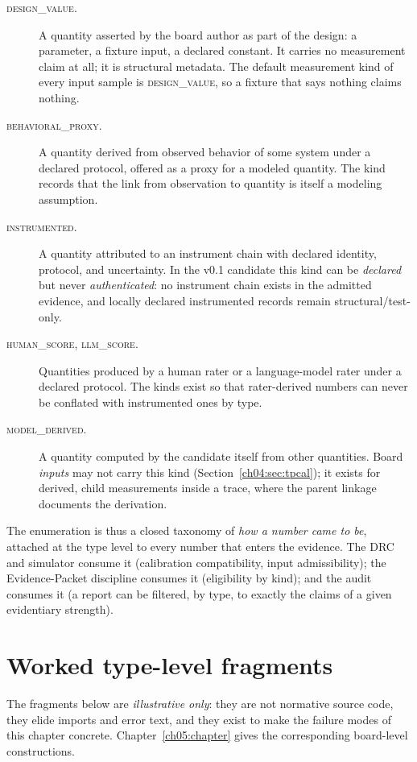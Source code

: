 \begin{description}
\item[\textsc{design\_value}.] A quantity asserted by the board author as
part of the design: a parameter, a fixture input, a declared constant. It
carries no measurement claim at all; it is structural metadata. The
default measurement kind of every input sample is \textsc{design\_value},
so a fixture that says nothing claims nothing.
\item[\textsc{behavioral\_proxy}.] A quantity derived from observed
behavior of some system under a declared protocol, offered as a proxy for
a modeled quantity. The kind records that the link from observation to
quantity is itself a modeling assumption.
\item[\textsc{instrumented}.] A quantity attributed to an instrument
chain with declared identity, protocol, and uncertainty. In the v0.1
candidate this kind can be \emph{declared} but never \emph{authenticated}:
no instrument chain exists in the admitted evidence, and locally declared
instrumented records remain structural/test-only.
\item[\textsc{human\_score}, \textsc{llm\_score}.] Quantities produced by
a human rater or a language-model rater under a declared protocol. The
kinds exist so that rater-derived numbers can never be conflated with
instrumented ones by type.
\item[\textsc{model\_derived}.] A quantity computed by the candidate
itself from other quantities. Board \emph{inputs} may not carry this kind
(Section~\ref{ch04:sec:tpcal}); it exists for derived, child measurements
inside a trace, where the parent linkage documents the derivation.
\end{description}

The enumeration is thus a closed taxonomy of \emph{how a number came to
be}, attached at the type level to every number that enters the evidence.
The DRC and simulator consume it (calibration compatibility, input
admissibility); the Evidence-Packet discipline consumes it (eligibility by
kind); and the audit consumes it (a report can be filtered, by type, to
exactly the claims of a given evidentiary strength).

\section{Worked type-level fragments}\label{ch04:sec:worked}

The fragments below are \emph{illustrative only}: they are not normative
source code, they elide imports and error text, and they exist to make the
failure modes of this chapter concrete. Chapter~\ref{ch05:chapter} gives
the corresponding board-level constructions.

